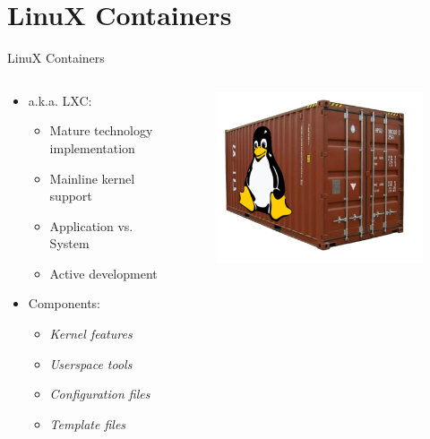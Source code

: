 \section{LinuX Containers}

\begin{frame}{LinuX Containers}
	\begin{columns}[T]
		\begin{column}{.6\textwidth}
			\begin{itemize}
			\item a.k.a. LXC:
				\begin{itemize}
				\item Mature technology implementation
				\item Mainline kernel support
				\item Application vs. System
				\item Active development
				\end{itemize}
			\item Components:
				\begin{itemize}
				\item \textit{Kernel features}
				\item \textit{Userspace tools}
				\item \textit{Configuration files}
				\item \textit{Template files}
				\end{itemize}
			\end{itemize}
		\end{column}
		\begin{column}{.4\textwidth}
			\begin{figure}[ht]
				\centering
				\includegraphics[width=\textwidth]{img/containers.png}
			\end{figure}
		\end{column}
	\end{columns}
\end{frame}

